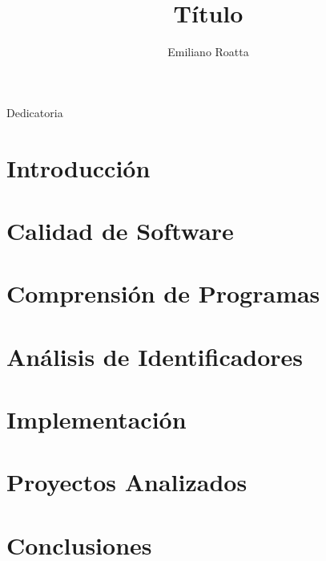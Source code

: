 \documentclass[a4paper,11pt,twoside,openright]{book}
\title{Título}
\author{Emiliano Roatta}
\begin{document}
\frontmatter

\maketitle

\begin{flushright}
\null{}
  Dedicatoria
\null
\end{flushright}



\tableofcontents
\listoffigures
\listoftables
\listofalgorithms

\mainmatter
\chapter{Introducción}


\chapter{Calidad de Software}


\chapter{Comprensión de Programas}






\chapter{Análisis de Identificadores}




\chapter{Implementación}





\chapter{Proyectos Analizados}


\chapter{Conclusiones}






\backmatter
\end{document}
